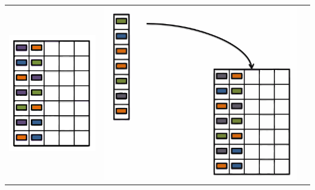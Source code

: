 \documentclass{beamer}
\begin{document}
\begin{frame}
	     \begin{center}
	     	\begin{tabular}{ccc}
	     		\includegraphics*[scale=0.23]{figures/FD1.pdf} &
	     		\includegraphics*[scale=0.23]{figures/FD2.pdf}  &

\end{tabular}
\end{center}
\end{frame}
\end{document}
